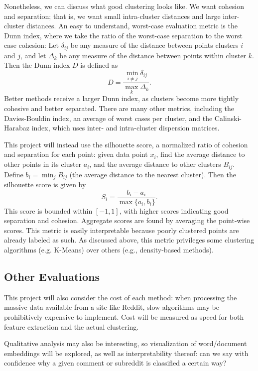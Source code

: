 \documentclass[]{article}
\begin{document}
Nonetheless, we can discuss what good clustering looks like. We want cohesion and separation; that is, we want small intra-cluster distances and large inter-cluster distances. An easy to understand, worst-case evaluation metric is the Dunn index, where we take the ratio of the worst-case separation to the worst case cohesion: Let $\delta_{ij}$ be any measure of the distance between points clusters $i$ and $j$, and let $\Delta_k$ be any measure of the distance between points within cluster $k$. Then the Dunn index $D$ is defined as
$$ D = \frac{\min_{i\ne j } \delta_{ij}}{\max_{k}\Delta_k}. $$
Better methods receive a larger Dunn index, as clusters become more tightly cohesive and better separated. There are many other metrics, including the Davies-Bouldin index, an average of worst cases per cluster, and the Calinski-Harabaz index, which uses inter- and intra-cluster dispersion matrices. 

This project will instead use the silhouette score, a normalized ratio of cohesion and separation for each point: given data point $x_i$, find the average distance to other points in its cluster $a_i$, and the average distance to other clusters $B_{ij}$. Define $b_i=\min_{j}B_{ij}$ (the average distance to the nearest cluster). Then the silhouette score is given by
$$ S_i = \frac{b_i-a_i}{\max\{a_i,b_i\}}.$$
This score is bounded within $[-1,1]$, with higher scores indicating good separation and cohesion. Aggregate scores are found by averaging the point-wise scores. This metric is easily interpretable because poorly clustered points are already labeled as such. As discussed above, this metric privileges some clustering algorithms (e.g. K-Means) over others (e.g., density-based methods).

\subsection{Other Evaluations}
This project will also consider the cost of each method: when processing the massive data available from a site like Reddit, slow algorithms may be prohibitively expensive to implement. Cost will be measured as speed for both feature extraction and the actual clustering.

Qualitative analysis may also be interesting, so visualization of word/document embeddings will be explored, as well as interpretability thereof: can we say with confidence why a given comment or subreddit is classified a certain way?
\end{document}

